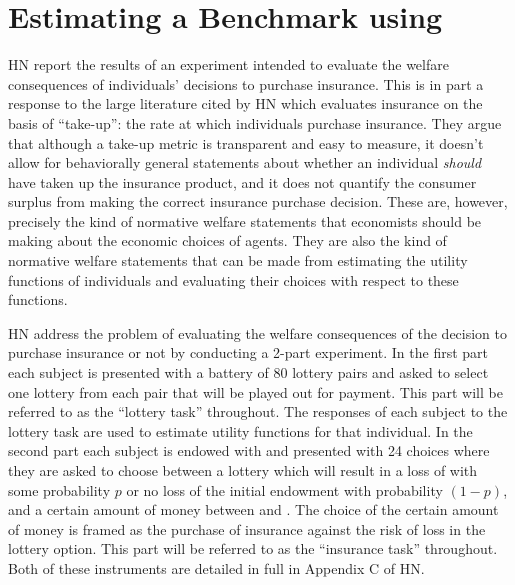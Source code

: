 \documentclass[../main.tex]{subfiles}
\begin{document}
\singlespacing
\section{Estimating a Benchmark using \texorpdfstring{\textcite{Harrison2016}}{Harrison and Ng (2015)}}
\doublespacing
\label{sec4:Bench}

HN report the results of an experiment intended to evaluate the welfare consequences of individuals' decisions to purchase insurance.
This is in part a response to the large literature cited by HN \parencite*[92]{Harrison2016} which evaluates insurance on the basis of \enquote{take-up}: the rate at which individuals purchase insurance.
They argue that although a take-up metric is transparent and easy to measure, it doesn't allow for behaviorally general statements about whether an individual \textit{should} have taken up the insurance product, and it does not quantify the consumer surplus from making the correct insurance purchase decision.
These are, however, precisely the kind of normative welfare statements that economists should be making about the economic choices of agents.
They are also the kind of normative welfare statements that can be made from estimating the utility functions of individuals and evaluating their choices with respect to these functions.

HN address the problem of evaluating the welfare consequences of the decision to purchase insurance or not by conducting a 2-part experiment.
In the first part each subject is presented with a battery of 80 lottery pairs and asked to select one lottery from each pair that will be played out for payment.
This part will be referred to as the \enquote{lottery task} throughout.
The responses of each subject to the lottery task are used to estimate utility functions for that individual.
In the second part each subject is endowed with  and presented with 24 choices where they are asked to choose between a lottery which will result in a loss of  with some probability $p$ or no loss of the initial endowment with probability $(1-p)$, and a certain amount of money between  and .
The choice of the certain amount of money is framed as the purchase of insurance against the risk of loss in the lottery option.
This part will be referred to as the \enquote{insurance task} throughout.
Both of these instruments are detailed in full in Appendix C of HN.
\end{document}
